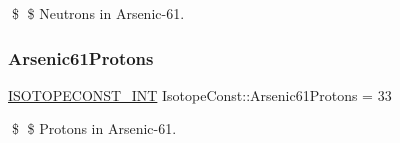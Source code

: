 \$ \$ Neutrons in Arsenic-\/61. \mbox{\label{group___isotope_const-_arsenic-_as61_ga57a5de2c025c5afc08134b93a53390a3}} 
\subsubsection{\texorpdfstring{Arsenic61\+Protons}{Arsenic61Protons}}
{\footnotesize\ttfamily \mbox{\hyperlink{group___isotope_const-_macros_ga5f18360b3e99483a35c32d789e62621c}{I\+S\+O\+T\+O\+P\+E\+C\+O\+N\+S\+T\+\_\+\+I\+NT}} Isotope\+Const\+::\+Arsenic61\+Protons = 33}

\$ \$ Protons in Arsenic-\/61. 